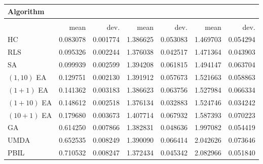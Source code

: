 \begin{tabular}{@{} l *{6}{>{{}}N{1}{2}} @{}}
\toprule
{Algorithm} &  \\
\midrule
&  &  &  \\
\midrule
& {mean} & {dev.} & {mean} & {dev.} & {mean} & {dev.} \\
\midrule
HC & 0.083078 & 0.001774 & 1.386625 & 0.053083 & 1.469703 & 0.054294 \\
RLS & 0.095326 & 0.002244 & 1.376038 & 0.042517 & 1.471364 & 0.043903 \\
SA & 0.099939 & 0.002599 & 1.394208 & 0.061815 & 1.494147 & 0.063704 \\
$(1,10)$ EA & 0.129751 & 0.002130 & 1.391912 & 0.057673 & 1.521663 & 0.058863 \\
$(1+1)$ EA & 0.141362 & 0.003183 & 1.386623 & 0.063756 & 1.527984 & 0.066334 \\
$(1+10)$ EA & 0.148612 & 0.002518 & 1.376134 & 0.032883 & 1.524746 & 0.034242 \\
$(10+1)$ EA & 0.179680 & 0.003673 & 1.407714 & 0.067932 & 1.587393 & 0.070223 \\
GA & 0.614250 & 0.007866 & 1.382831 & 0.048636 & 1.997082 & 0.054419 \\
UMDA & 0.652535 & 0.008249 & 1.390090 & 0.066414 & 2.042626 & 0.073646 \\
PBIL & 0.710532 & 0.008247 & 1.372434 & 0.045342 & 2.082966 & 0.051840 \\
\bottomrule
\end{tabular}
